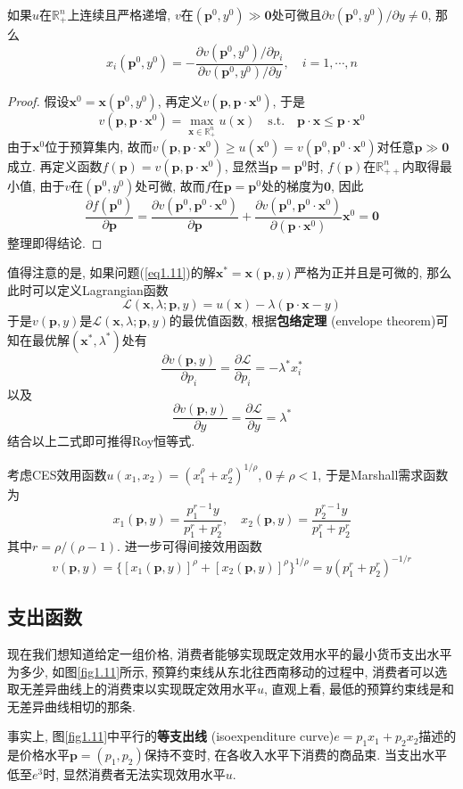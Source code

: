 \documentclass[cn, 12pt, math=mtpro2, bibstyle=apa, blue, twocol]{elegantbook}
\newcommand{\R}{\mathbb{R}}
\newcommand{\p}{\mathbf{p}}
\newcommand{\x}{\mathbf{x}}
\begin{document}
\begin{theorem}[Roy恒等式]
  如果$u$在$\R_+^n$上连续且严格递增, $v$在$(\p^0,y^0)\gg\mathbf{0}$处可微且$\partial v(\p^0,y^0)/\partial y\ne0$, 那么
  $$x_i(\p^0,y^0)=-\frac{\partial v(\p^0,y^0)/\partial p_i}{\partial v(\p^0,y^0)/\partial y},\quad i=1,\cdots,n$$
\end{theorem}
\begin{proof}
  假设$\x^0=\x(\p^0,y^0)$, 再定义$v(\p,\p\cdot\x^0)$, 于是
  $$v(\p,\p\cdot\x^0)=\max_{\x\in\R_+^n}u(\x)\quad\text{s.t.}\quad \p\cdot\x\leq \p\cdot\x^0$$
  由于$\x^0$位于预算集内, 故而$v(\p,\p\cdot\x^0)\geq u(\x^0)=v(\p^0,\p^0\cdot\x^0)$对任意$\p\gg\mathbf{0}$成立. 再定义函数$f(\p)=v(\p,\p\cdot\x^0)$, 显然当$\p=\p^0$时, $f(\p)$在$\R_{++}^n$内取得最小值, 由于$v$在$(\p^0,y^0)$处可微, 故而$f$在$\p=\p^0$处的梯度为$\mathbf{0}$, 因此
  $$\frac{\partial f(\p^0)}{\partial \p}=\frac{\partial v(\p^0,\p^0\cdot\x^0)}{\partial \p}+\frac{\partial v(\p^0,\p^0\cdot\x^0)}{\partial (\p\cdot\x^0)}\x^0=\mathbf{0}$$
  整理即得结论.
\end{proof}
值得注意的是, 如果问题(\ref{eq1.11})的解$\x^\ast=\x(\p,y)$严格为正并且是可微的, 那么此时可以定义Lagrangian函数
$$\mathcal{L}(\x,\lambda;\p,y)=u(\x)-\lambda(\p\cdot\x-y)$$
于是$v(\p,y)$是$\mathcal{L}(\x,\lambda;\p,y)$的最优值函数, 根据\textbf{包络定理} (envelope theorem)可知在最优解$(\x^\ast,\lambda^\ast)$处有
$$\frac{\partial v(\p,y)}{\partial p_i}=\frac{\partial \mathcal{L}}{\partial p_i}=-\lambda^\ast x_i^\ast$$
以及
$$\frac{\partial v(\p,y)}{\partial y}=\frac{\partial \mathcal{L}}{\partial y}=\lambda^\ast$$
结合以上二式即可推得Roy恒等式.

\begin{example}
考虑CES效用函数$u(x_1,x_2)=(x_1^\rho+x_2^\rho)^{1/\rho}$, $0\neq\rho<1$, 于是Marshall需求函数为
$$x_1(\p,y)=\frac{p_1^{r-1}y}{p_1^r+p_2^r},\quad x_2(\p,y)=\frac{p_2^{r-1}y}{p_1^r+p_2^r}$$
其中$r=\rho/(\rho-1)$. 进一步可得间接效用函数
$$v(\p,y)=\{[x_1(\p,y)]^\rho+[x_2(\p,y)]^\rho\}^{1/\rho}=y(p_1^r+p_2^r)^{-1/r}$$
\end{example}
\subsection{支出函数}
现在我们想知道给定一组价格, 消费者能够实现既定效用水平的最小货币支出水平为多少, 如图\ref{fig1.11}所示, 预算约束线从东北往西南移动的过程中, 消费者可以选取无差异曲线上的消费束以实现既定效用水平$u$, 直观上看, 最低的预算约束线是和无差异曲线相切的那条.

事实上, 图\ref{fig1.11}中平行的\textbf{等支出线 }(isoexpenditure curve)$e=p_1x_1+p_2x_2$描述的是价格水平$\p=(p_1,p_2)$保持不变时, 在各收入水平下消费的商品束. 当支出水平低至$e^3$时, 显然消费者无法实现效用水平$u$.
\end{document}
